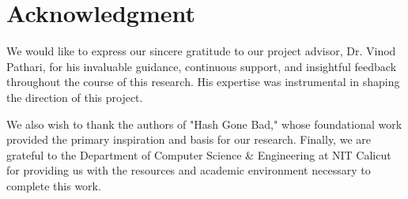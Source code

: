 \documentclass[journal]{IEEEtran}
\begin{document}
\section*{Acknowledgment}

We would like to express our sincere gratitude to our project advisor, Dr. Vinod Pathari, for his invaluable guidance, continuous support, and insightful feedback throughout the course of this research. His expertise was instrumental in shaping the direction of this project.

We also wish to thank the authors of "Hash Gone Bad," \cite{cheval2023hash} whose foundational work provided the primary inspiration and basis for our research. Finally, we are grateful to the Department of Computer Science \& Engineering at NIT Calicut for providing us with the resources and academic environment necessary to complete this work.


\ifCLASSOPTIONcaptionsoff
  \newpage
\fi




\end{document}
